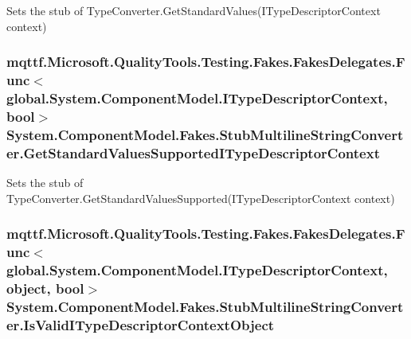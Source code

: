 Sets the stub of Type\-Converter.\-Get\-Standard\-Values(\-I\-Type\-Descriptor\-Context context)

\hypertarget{class_system_1_1_component_model_1_1_fakes_1_1_stub_multiline_string_converter_a94179ba8d30d5b28d11b6b23d85bbbf6}{
\subsubsection[{Get\-Standard\-Values\-Supported\-I\-Type\-Descriptor\-Context}]{\setlength{\rightskip}{0pt plus 5cm}mqttf.\-Microsoft.\-Quality\-Tools.\-Testing.\-Fakes.\-Fakes\-Delegates.\-Func$<$global.\-System.\-Component\-Model.\-I\-Type\-Descriptor\-Context, bool$>$ System.\-Component\-Model.\-Fakes.\-Stub\-Multiline\-String\-Converter.\-Get\-Standard\-Values\-Supported\-I\-Type\-Descriptor\-Context}}\label{class_system_1_1_component_model_1_1_fakes_1_1_stub_multiline_string_converter_a94179ba8d30d5b28d11b6b23d85bbbf6}


Sets the stub of Type\-Converter.\-Get\-Standard\-Values\-Supported(\-I\-Type\-Descriptor\-Context context)

\hypertarget{class_system_1_1_component_model_1_1_fakes_1_1_stub_multiline_string_converter_a3e3ac44dfd1208a2c550a0f4699b8bf8}{
\subsubsection[{Is\-Valid\-I\-Type\-Descriptor\-Context\-Object}]{\setlength{\rightskip}{0pt plus 5cm}mqttf.\-Microsoft.\-Quality\-Tools.\-Testing.\-Fakes.\-Fakes\-Delegates.\-Func$<$global.\-System.\-Component\-Model.\-I\-Type\-Descriptor\-Context, object, bool$>$ System.\-Component\-Model.\-Fakes.\-Stub\-Multiline\-String\-Converter.\-Is\-Valid\-I\-Type\-Descriptor\-Context\-Object}}\label{class_system_1_1_component_model_1_1_fakes_1_1_stub_multiline_string_converter_a3e3ac44dfd1208a2c550a0f4699b8bf8}



